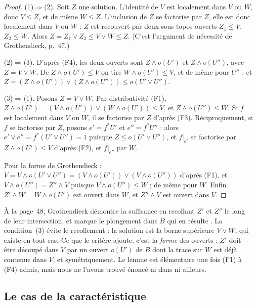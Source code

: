 \begin{proof}
(1)$\Rightarrow$(2). Soit $Z$ une solution. L'identité de $V$ est localement dans $V$ ou $W$, donc $V\le Z$, et de même $W\le Z$. L'inclusion de $Z$ se factorise par $Z$, elle est donc localement dans $V$ ou $W$ : $Z$ est recouvert par deux sous-topos ouverts $Z_1\le V$, $Z_2\le W$. Alors $Z = Z_1\vee Z_2\le V\vee W\le Z$. (C'est l'argument de nécessité de Grothendieck, p.~47.)

(2)$\Rightarrow$(3). D'après (F4), les deux ouverts sont $Z\wedge o(U')$ et $Z\wedge o(U'')$, avec $Z = V\vee W$. De $Z\wedge o(U')\le V$ on tire $W\wedge o(U')\le V$, et de même pour $U''$ ; et $Z = (Z\wedge o(U'))\vee(Z\wedge o(U''))\le o(U'\vee U'')$.

(3)$\Rightarrow$(1). Posons $Z = V\vee W$. Par distributivité (F1), $Z\wedge o(U') = (V\wedge o(U'))\vee(W\wedge o(U'))\le V$, et $Z\wedge o(U'')\le W$. Si $f$ est localement dans $V$ ou $W$, il se factorise par $Z$ d'après (F3). Réciproquement, si $f$ se factorise par $Z$, posons $e' = f^*U'$ et $e'' = f^*U''$ : alors $e'\vee e'' = f^*(U'\vee U'') = 1$ puisque $Z\le o(U'\vee U'')$, et $f|_{e'}$ se factorise par $Z\wedge o(U')\le V$ d'après (F2), et $f|_{e''}$ par $W$.

Pour la forme de Grothendieck : $V = V\wedge o(U'\vee U'') = (V\wedge o(U'))\vee(V\wedge o(U''))$ d'après (F1), et $V\wedge o(U'') = Z''\wedge V$ puisque $V\wedge o(U'')\le W$ ; de même pour $W$. Enfin $Z'\wedge W = W\wedge o(U')$ est ouvert dans $W$, et $Z''\wedge V$ est ouvert dans $V$.
\end{proof}

\begin{remark}
À la page~48, Grothendieck démontre la suffisance en recollant $Z'$ et $Z''$ le long de leur intersection, et marque le plongement dans $B$ qui en résulte . La condition~(3) évite le recollement : la solution est la borne supérieure $V\vee W$, qui existe en tout cas. Ce que le critère ajoute, c'est la \emph{forme} des ouverts : $Z'$ doit être découpé dans $V$ par un ouvert $o(U')$ de $B$ dont la trace sur $W$ est déjà contenue dans $V$, et symétriquement. Le lemme est élémentaire une fois (F1) à (F4) admis, mais nous ne l'avons trouvé énoncé ni dans \cite{elephant} ni ailleurs.
\end{remark}

\subsection{Le cas de la caractéristique}

